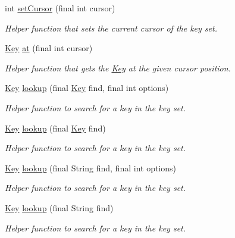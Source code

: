 \begin{DoxyCompactItemize}
int \hyperlink{classorg_1_1libelektra_1_1KeySet_adb3caad35c8dfcd1934d7cd32ff0ca4a}{set\+Cursor} (final int cursor)
\begin{DoxyCompactList}\small\item\em Helper function that sets the current cursor of the key set. \end{DoxyCompactList}\item 
\hyperlink{classorg_1_1libelektra_1_1Key}{Key} \hyperlink{classorg_1_1libelektra_1_1KeySet_a125d86734bd428c9eb1f937eb1b7ab74}{at} (final int cursor)
\begin{DoxyCompactList}\small\item\em Helper function that gets the \hyperlink{classorg_1_1libelektra_1_1Key}{Key} at the given cursor position. \end{DoxyCompactList}\item 
\hyperlink{classorg_1_1libelektra_1_1Key}{Key} \hyperlink{classorg_1_1libelektra_1_1KeySet_a6fb319a768b1cb43464154a93f9a2e93}{lookup} (final \hyperlink{classorg_1_1libelektra_1_1Key}{Key} find, final int options)
\begin{DoxyCompactList}\small\item\em Helper function to search for a key in the key set. \end{DoxyCompactList}\item 
\hyperlink{classorg_1_1libelektra_1_1Key}{Key} \hyperlink{classorg_1_1libelektra_1_1KeySet_a9ff1d475fd6ae316515c4c1cc173991b}{lookup} (final \hyperlink{classorg_1_1libelektra_1_1Key}{Key} find)
\begin{DoxyCompactList}\small\item\em Helper function to search for a key in the key set. \end{DoxyCompactList}\item 
\hyperlink{classorg_1_1libelektra_1_1Key}{Key} \hyperlink{classorg_1_1libelektra_1_1KeySet_aa17a04907eb8c8d2a9a488788d0039ea}{lookup} (final String find, final int options)
\begin{DoxyCompactList}\small\item\em Helper function to search for a key in the key set. \end{DoxyCompactList}\item 
\hyperlink{classorg_1_1libelektra_1_1Key}{Key} \hyperlink{classorg_1_1libelektra_1_1KeySet_a69921726091c9a775bb8ece1f1e3a858}{lookup} (final String find)
\begin{DoxyCompactList}\small\item\em Helper function to search for a key in the key set. \end{DoxyCompactList}\end{DoxyCompactItemize}
